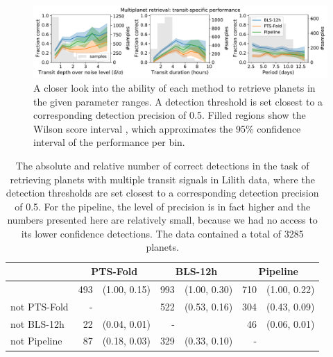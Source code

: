 \begin{figure}
    \centering
    \includegraphics[width=\linewidth]{Experiments/Figures/Multis/multi_transit_specific.pdf}
    \caption{A closer look into the ability of each method to retrieve planets in the given parameter ranges. A detection threshold is set closest to a corresponding detection precision of 0.5. Filled regions show the Wilson score interval \citep{wilson1927probable}, which approximates the 95\% confidence interval of the performance per bin.}
    \label{fig:multi_transit}
\end{figure}

\begin{table}[]
\label{tab:multi_AnotB}
\centering
\begin{tabular}{@{}lrlrlrl@{}}
\toprule
             & \multicolumn{2}{c}{PTS-Fold} & \multicolumn{2}{c}{BLS-12h} & \multicolumn{2}{c}{Pipeline} \\ \midrule
             & 493      & (1.00, 0.15)      & 993      & (1.00, 0.30)     & 710      & (1.00, 0.22)      \\
not PTS-Fold & -        &                   & 522      & (0.53, 0.16)     & 304      & (0.43, 0.09)      \\
not BLS-12h  & 22       & (0.04, 0.01)      & -        &                  & 46       & (0.06, 0.01)      \\
not Pipeline & 87       & (0.18, 0.03)      & 329      & (0.33, 0.10)     & -        &                   \\ \bottomrule
\end{tabular}
\caption{The absolute and relative number of correct detections in the task of retrieving planets with multiple transit signals in Lilith data, where the detection thresholds are set closest to a corresponding detection precision of 0.5. For the pipeline, the level of precision is in fact higher and the numbers presented here are relatively small, because we had no access to its lower confidence detections. The data contained a total of 3285 planets.}
\end{table}

